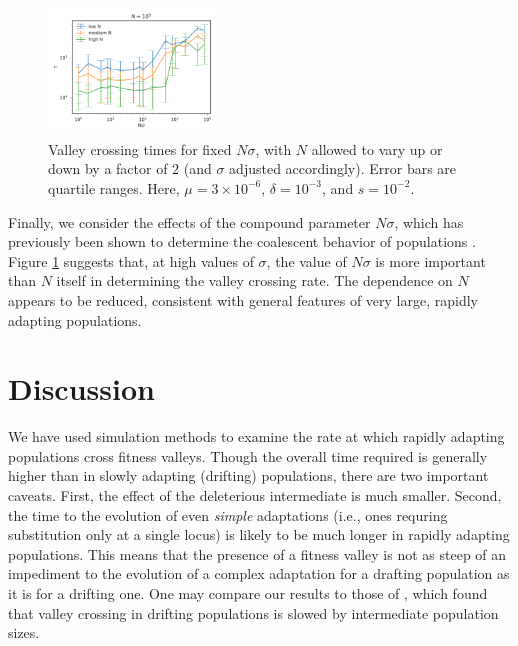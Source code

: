 \documentclass[rmp]{revtex4}
\begin{document}
\begin{figure}
\includegraphics[width=0.4\textwidth]{Figures/bands.pdf}
\caption{Valley crossing times for fixed $N\sigma$, with $N$ allowed to vary up or down by a factor of $2$ (and $\sigma$ adjusted accordingly). Error bars are quartile ranges. Here, $\mu = 3 \times 10^{-6}$, $\delta = 10^{-3}$, and $s = 10^{-2}$.}
\label{fig:bands}
\end{figure}

Finally, we consider the effects of the compound parameter $N\sigma$, which has previously been shown to determine the coalescent behavior of populations \citep{neher_hallatschek_2013, neher_kessinger_2013}.
Figure \ref{fig:bands} suggests that, at high values of $\sigma$, the value of $N\sigma$ is more important than $N$ itself in determining the valley crossing rate.
The dependence on $N$ appears to be reduced, consistent with general features of very large, rapidly adapting populations.

\section*{Discussion}

We have used simulation methods to examine the rate at which rapidly adapting populations cross fitness valleys.
Though the overall time required is generally higher than in slowly adapting (drifting) populations, there are two important caveats.
First, the effect of the deleterious intermediate is much smaller.
Second, the time to the evolution of even \emph{simple} adaptations (i.e., ones requring substitution only at a single locus) is likely to be much longer in rapidly adapting populations.
This means that the presence of a fitness valley is not as steep of an impediment to the evolution of a complex adaptation for a drafting population as it is for a drifting one.
One may compare our results to those of \citet{ochs_2015}, which found that valley crossing in drifting populations is slowed by intermediate population sizes.
\end{document}
